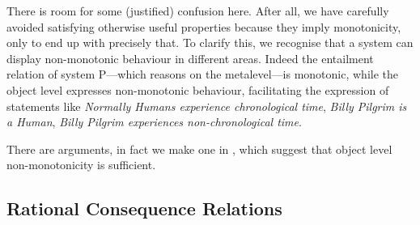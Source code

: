 There is room for some (justified) confusion here. After all, we have carefully avoided satisfying otherwise useful properties
because they imply monotonicity, only to end up with precisely that. To clarify this, we recognise that a system can
display non-monotonic behaviour in different areas. Indeed the entailment relation of system P---which reasons on the metalevel---is
monotonic, while the object level expresses non-monotonic behaviour, facilitating the expression of statements like \textit{Normally
Humans experience chronological time}, \textit{Billy Pilgrim is a Human}, \textit{Billy Pilgrim experiences non-chronological
time}.

There are arguments, in fact we make one in , which suggest that object level
non-monotonicity is sufficient.





\subsection{Rational Consequence Relations}
\label{subsection:rational-consequence-relations}

